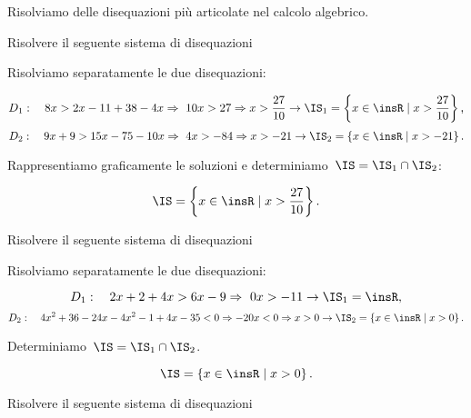 Risolviamo delle disequazioni più articolate nel calcolo algebrico.

\begin{exrig}
 \begin{esempio}
Risolvere il seguente sistema di disequazioni

Risolviamo separatamente le due disequazioni:

\[D_{1}:\quad 8x>2x-11+38-4x\Rightarrow~10x>27\Rightarrow x>\frac{27}{10}\rightarrow\IS_{1}=\left\{x\in\insR\mid x>\frac{27}{10}\right\}\text{,}\]
\[D_{2}:\quad 9x+9>15x-75-10x\Rightarrow~4x>-84\Rightarrow x>-21\rightarrow \IS_{2}=\left\{x\in\insR\mid x>-21\right\}.\]

Rappresentiamo graficamente le soluzioni e determiniamo~$\IS=\IS_{1}\cap \IS_{2}$:
\begin{center}

\end{center}
\[\IS=\left\{x\in\insR\mid x>\frac{27}{10}\right\}.\]
 \end{esempio}

 \begin{esempio}
 Risolvere il seguente sistema di disequazioni

Risolviamo separatamente le due disequazioni:

\[D_{1}:\quad 2x+2+4x>6x-9\Rightarrow~0x>-11\rightarrow\IS_{1}=\insR,\]
\[D_{2}:\quad 4x^{2}+36-24x-4x^{2}-1+4x-35<0\Rightarrow -20x<0\Rightarrow x>0\rightarrow\IS_{2}=\left\{x\in \insR\mid x>0\right\}.\]

Determiniamo~$\IS=\IS_{1}\cap \IS_{2}$.
\begin{center}

\end{center}
 \[\IS=\left\{x\in \insR\mid x>0\right\}.\]
 \end{esempio}

 \begin{esempio}
 Risolvere il seguente sistema di disequazioni


\end{esempio}
\end{exrig}
